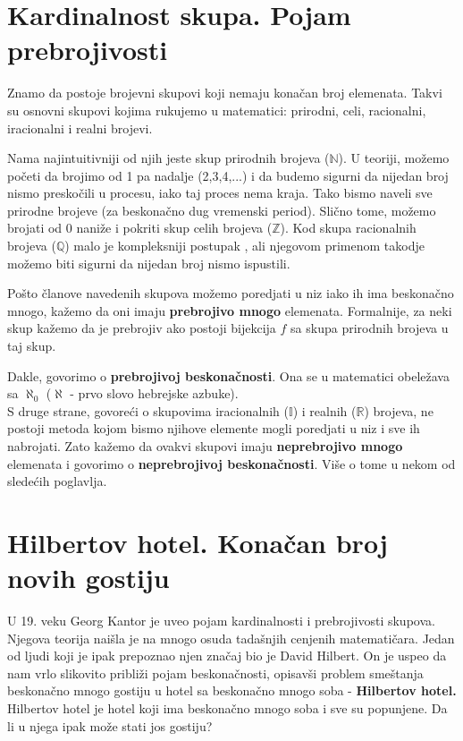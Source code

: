 \documentclass[a4paper]{article}
\begin{document}
\section{Kardinalnost skupa. Pojam prebrojivosti}
\label{poglavlje:Kardinalnost. Pojam prebrojivosti}

Znamo da postoje brojevni skupovi koji nemaju konačan broj elemenata. Takvi su osnovni skupovi kojima rukujemo u matematici: prirodni, celi, racionalni, iracionalni i realni brojevi.

Nama najintuitivniji od njih jeste skup prirodnih brojeva ($\mathbb{N}$). U teoriji, možemo početi da brojimo od 1 pa nadalje (2,3,4,...) i da budemo sigurni da nijedan broj nismo preskočili u procesu, iako taj proces nema kraja. Tako bismo naveli sve prirodne brojeve (za beskonačno dug vremenski period). Slično tome, možemo brojati od 0 naniže i pokriti skup celih brojeva ($\mathbb{Z}$). Kod skupa racionalnih brojeva ($\mathbb{Q}$) malo je kompleksniji postupak \cite{Kantorov dijagonalni postupak}, ali njegovom primenom takodje možemo biti sigurni da nijedan broj nismo ispustili.

Pošto članove navedenih skupova možemo poredjati u niz iako ih ima beskonačno mnogo, kažemo da oni imaju \textbf{prebrojivo mnogo} elemenata. Formalnije, za neki skup kažemo da je prebrojiv ako postoji bijekcija $f$ sa skupa prirodnih brojeva u taj skup.

Dakle, govorimo o \textbf{prebrojivoj beskonačnosti}. Ona se u matematici obeležava sa $\aleph_{0}$ ($\aleph$ - prvo slovo hebrejske azbuke).\\

S druge strane, govoreći o skupovima iracionalnih ($\mathbb{I}$) i realnih ($\mathbb{R}$) brojeva, ne postoji metoda kojom bismo njihove elemente mogli poredjati u niz i sve ih nabrojati. Zato kažemo da ovakvi skupovi imaju \textbf{neprebrojivo mnogo} elemenata i govorimo o \textbf{neprebrojivoj beskonačnosti}. Više o tome u nekom od sledećih poglavlja.


\section{Hilbertov hotel. Konačan broj novih gostiju}
U 19. veku Georg Kantor je uveo pojam kardinalnosti i prebrojivosti skupova. Njegova teorija naišla je na mnogo osuda tadašnjih cenjenih matematičara.
Jedan od ljudi koji je ipak prepoznao njen značaj bio je David Hilbert.
On je uspeo da nam vrlo slikovito približi pojam beskonačnosti, opisavši problem smeštanja beskonačno mnogo gostiju u hotel sa beskonačno mnogo soba - \textbf{Hilbertov hotel.}
Hilbertov hotel je hotel koji ima beskonačno mnogo soba i sve su popunjene. Da li u njega ipak može stati jos gostiju?
\end{document}
